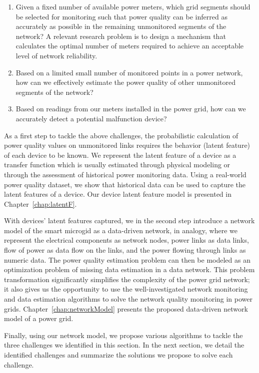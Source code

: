 \begin{enumerate}
\item Given a fixed number of available power meters, which grid segments should be selected for monitoring such that power quality can be inferred as accurately as possible in the remaining unmonitored segments of the network? A relevant research problem is to design a mechanism that calculates the optimal number of meters required to achieve an acceptable level of network reliability.

\item Based on a limited small number of monitored points in a power network, how can we effectively estimate the power quality of other unmonitored segments of the network?

\item Based on readings from our meters installed in the power grid, how can we accurately detect a potential malfunction device?
\end{enumerate}

As a first step to tackle the above challenges, the probabilistic calculation of power quality values on unmonitored links requires the behavior (latent feature) of each device to be known. We represent the latent feature of a device as a transfer function which is usually estimated through physical modeling or through the assessment of historical power monitoring data. Using a real-world power quality dataset, we show that historical data can be used to capture the latent features of a device. Our device latent feature model is presented in Chapter~\ref{chap:latentF}.

With devices' latent features captured, we in the second step introduce a network model of the smart microgid as a data-driven network, in analogy, where we represent the electrical components as network nodes, power links as data links, flow of power as data flow on the links, and the power flowing through links as numeric data. The power quality estimation problem can then be modeled as an optimization problem of missing data estimation in a data network. This problem transformation significantly simplifies the complexity of the power grid network; it also gives us the opportunity to use the well-investigated network monitoring and data estimation algorithms to solve the network quality monitoring in power grids. Chapter~\ref{chap:networkModel} presents the proposed data-driven network model of a power grid.

Finally, using our network model, we propose various algorithms to tackle the three challenges we identified in this section. In the next section, we detail the identified challenges and summarize the solutions we propose to solve each challenge.

